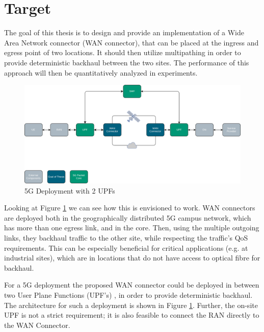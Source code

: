 
\section{Target}
\label{sec:target}

The goal of this thesis is to design and provide an implementation of a Wide Area Network connector (WAN connector), that can be placed at the ingress and egress point of two locations. It should then utilize multipathing in order to provide deterministic backhaul between the two sites. The performance of this approach will then be quantitatively analyzed in experiments.

\begin{figure}[h]
    \centering
        \includegraphics[width=\textwidth]{fig/telco-use-case-2.png}
        \caption{5G Deployment with 2 UPFs}
        \label{fig:telco}
\end{figure}

Looking at Figure \ref{fig:telco} we can see how this is envisioned to work. WAN connectors are deployed both in the geographically distributed 5G campus network, which has more than one egress link, and in the core. Then, using the multiple outgoing links, they backhaul traffic to the other site, while respecting the traffic's QoS requirements. This can be especially beneficial for critical applications (e.g. at industrial sites), which are in locations that do not have access to optical fibre for backhaul.

For a 5G deployment the proposed WAN connector could be deployed in between two User Plane Functions (UPF's) , in order to provide deterministic backhaul. The architecture for such a deployment is shown in Figure \ref{fig:telco}. Further, the on-site UPF is not a strict requirement; it is also feasible to connect the RAN directly to the WAN Connector.



